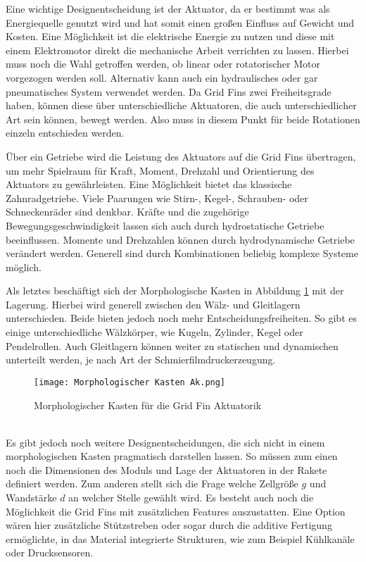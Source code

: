 Eine wichtige Designentscheidung ist der Aktuator, da er bestimmt was als Energiequelle genutzt wird und hat somit einen großen Einfluss auf Gewicht und Kosten. Eine Möglichkeit ist die elektrische Energie zu nutzen und diese mit einem Elektromotor direkt die mechanische Arbeit verrichten zu lassen. Hierbei muss noch die Wahl getroffen werden, ob linear oder rotatorischer Motor vorgezogen werden soll. Alternativ kann auch ein hydraulisches oder gar pneumatisches System verwendet werden. Da Grid Fins zwei Freiheitsgrade haben, können diese über unterschiedliche Aktuatoren, die auch unterschiedlicher Art sein können, bewegt werden. Also muss in diesem Punkt für beide Rotationen einzeln entschieden werden.

Über ein Getriebe wird die Leistung des Aktuators auf die Grid Fins übertragen, um mehr Spielraum für Kraft, Moment, Drehzahl und Orientierung des Aktuators zu gewährleisten. Eine Möglichkeit bietet das klassische Zahnradgetriebe. Viele Paarungen wie Stirn-, Kegel-, Schrauben- oder Schneckenräder sind denkbar. Kräfte und die zugehörige Bewegungsgeschwindigkeit lassen sich auch durch hydrostatische Getriebe beeinflussen. Momente und Drehzahlen können durch hydrodynamische Getriebe verändert werden. Generell sind durch Kombinationen beliebig komplexe Systeme möglich.

Als letztes beschäftigt sich der Morphologische Kasten in Abbildung \ref{abb_MorphKastAk} mit der Lagerung. Hierbei wird generell zwischen den Wälz- und Gleitlagern unterschieden. Beide bieten jedoch noch mehr Entscheidungsfreiheiten. So gibt es einige unterschiedliche Wälzkörper, wie Kugeln, Zylinder, Kegel oder Pendelrollen. Auch Gleitlagern können weiter zu statischen und dynamischen unterteilt werden, je nach Art der Schmierfilmdruckerzeugung.
\begin{figure}[h]
	\centering
	\texttt{[image: Morphologischer Kasten Ak.png]}
	\caption{Morphologischer Kasten für die Grid Fin Aktuatorik}
	\label{abb_MorphKastAk}
\end{figure}\\
Es gibt jedoch noch weitere Designentscheidungen, die sich nicht in einem morphologischen Kasten pragmatisch darstellen lassen. So müssen zum einen noch die Dimensionen des Moduls und Lage der Aktuatoren in der Rakete definiert werden. Zum anderen stellt sich die Frage welche Zellgröße $g$ und Wandstärke $d$ an welcher Stelle gewählt wird. Es besteht auch noch die Möglichkeit die Grid Fins mit zusätzlichen Features auszustatten. Eine Option wären hier zusätzliche Stützstreben oder sogar durch die additive Fertigung ermöglichte, in das Material integrierte Strukturen, wie zum Beispiel Kühlkanäle oder Drucksensoren.
\newpage
